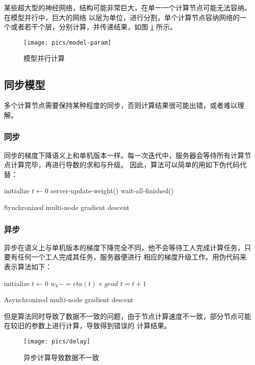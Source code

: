 \documentclass{ctexart}
\begin{document}
某些超大型的神经网络，结构可能非常巨大，在单一一个计算节点可能无法容纳。在模型并行中，巨大的网络
以层为单位，进行分割，单个计算节点容纳网络的一个或者若干个层，分别计算，并传递结果，如图 \ref{fig:model-param}
所示。

\begin{figure}
\centering
\texttt{[image: pics/model-param]}
\caption{模型并行计算}
\label{fig:model-param}
\end{figure}

\subsection{同步模型}

多个计算节点需要保持某种程度的同步，否则计算结果很可能出错，或者难以理解。

\subsubsection{同步}
同步的梯度下降语义上和单机版本一样。每一次迭代中，服务器会等待所有计算节点计算完毕，再进行导数的求和与升级。
因此，算法可以简单的用如下伪代码代替：

\begin{algorithm}[H]
	initialize $t \leftarrow 0$ \;
	 {
		server-update-weight()\;
		wait-all-finished()\;
	}
	\caption{Synchronized multi-node gradient descent}
\end{algorithm}

\subsubsection{异步}

异步在语义上与单机版本的梯度下降完全不同，他不会等待工人完成计算任务，只要有任何一个工人完成其任务，服务器便进行
相应的梯度升级工作。用伪代码来表示算法如下：

\begin{algorithm}[H]
	initialize $t \leftarrow 0$ \;
	 {
		$ w_k -= eta(t) \times grad$\;
		$t = t + 1$\;
	}
	\caption{Asynchronized multi-node gradient descent}
\end{algorithm}

但是算法同时导致了数据不一致的问题，由于节点计算速度不一致，部分节点可能在较旧的参数上进行计算，导致得到错误的
计算结果。

\begin{figure}
\centering
\texttt{[image: pics/delay]}
\caption{异步计算导致数据不一致}
\label{fig:delay}
\end{figure}
\end{document}
